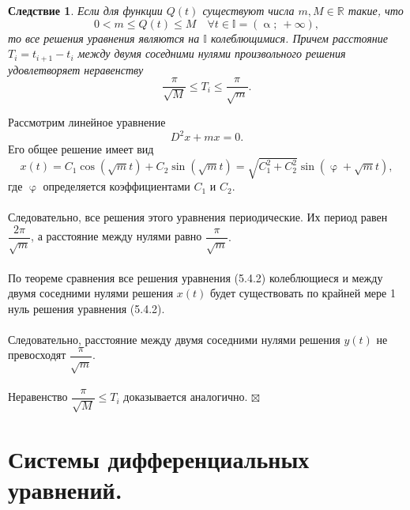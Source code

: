 \documentclass[a4paper, 12pt]{report}
\newenvironment{Proof} %
{\par\noindent{$\blacklozenge$}} %
{\hfill$\scriptstyle\boxtimes$}
\newcommand{\Rm}{\mathbb{R}}
\newcommand{\I}{\mathbb{I}}
\renewcommand{\leq}{\leqslant}
\renewcommand{\alpha}{\upalpha}
\renewcommand{\varphi}{\upvarphi}
\newtheorem*{cor}{Следствие}
\begin{document}
\begin{cor}
	Если для функции $Q(t)$ существуют числа $m, M \in \Rm$ такие, что $$ 0 < m \leq Q(t) \leq M\quad \forall t \in \I = (\alpha;\ +\infty),$$ то все решения уравнения являются на $\I$ колеблющимися. Причем расстояние $T_i = t_{i+1} - t_i$ между двумя соседними нулями произвольного решения удовлетворяет неравенству $$\dfrac{\pi}{\sqrt M} \leq T_i\leq \dfrac{\pi}{\sqrt m}.$$
\end{cor}\begin{Proof}
Рассмотрим линейное уравнение $$D^2x + mx = 0.$$
Его общее решение имеет вид $$x(t) = C_1\cos (\sqrt m t) + C_2\sin (\sqrt m t) = \sqrt{C_1^2 + C_2^2}\sin (\varphi + \sqrt m t),$$
где $\varphi$ определяется коэффициентами $C_1$ и $C_2$.\\\\
Следовательно, все решения этого уравнения периодические. Их период равен $\dfrac{2\pi}{\sqrt m}$, а расстояние между нулями равно $\dfrac{\pi}{\sqrt m}.$\\\\
По теореме сравнения все решения уравнения (5.4.2) колеблющиеся и между двумя соседними нулями решения $x(t)$ будет существовать по крайней мере 1 нуль решения уравнения (5.4.2).\\\\
Следовательно, расстояние между двумя соседними нулями решения $y(t)$ не превосходят $\dfrac{\pi}{\sqrt m}$.\\\\
Неравенство $\dfrac{\pi}{\sqrt M}  \leq T_i$ доказывается аналогично.
\end{Proof}
\chapter{Системы дифференциальных уравнений.}
\end{document}
